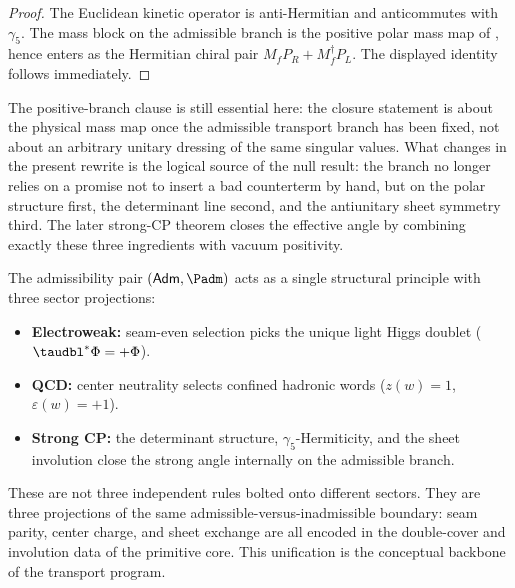 \begin{proof}
The Euclidean kinetic operator is anti-Hermitian and anticommutes with $\gamma_5$. The mass block
on the admissible branch is the positive polar mass map of , hence
enters as the Hermitian chiral pair $M_fP_R+M_f^\dagger P_L$. The displayed identity follows
immediately.
\end{proof}

The positive-branch clause is still essential here: the closure statement is about the physical
mass map once the admissible transport branch has been fixed, not about an arbitrary unitary
dressing of the same singular values. What changes in the present rewrite is the logical source
of the null result: the branch no longer relies on a promise not to insert a bad counterterm by
hand, but on the polar structure first, the determinant line second, and the antiunitary sheet
symmetry third. The later strong-CP theorem closes the effective angle by combining exactly these
three ingredients with vacuum positivity.

\begin{remark}
The admissibility pair $(\mathsf{Adm},\Padm)$ acts as a single structural principle with three sector projections:
\begin{itemize}[leftmargin=1.5em, topsep=3pt, itemsep=2pt]
    \item \textbf{Electroweak:} seam-even selection picks the unique light Higgs doublet ($\taudbl^{\ast}\Phi=+\Phi$).
    \item \textbf{QCD:} center neutrality selects confined hadronic words ($z(w)=1$, $\varepsilon(w)=+1$).
    \item \textbf{Strong CP:} the determinant structure, $\gamma_5$-Hermiticity, and the sheet involution close the strong angle internally on the admissible branch.
\end{itemize}
These are not three independent rules bolted onto different sectors. They are three projections of the same admissible-versus-inadmissible boundary: seam parity, center charge, and sheet exchange are all encoded in the double-cover and involution data of the primitive core. This unification is the conceptual backbone of the transport program.
\end{remark}


